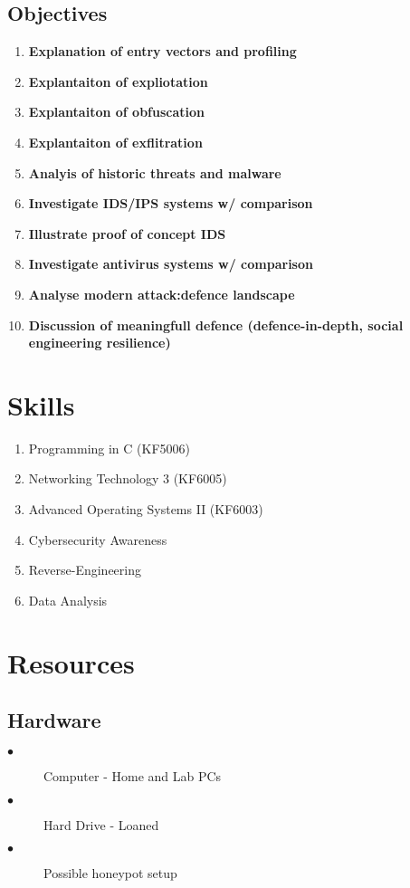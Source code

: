 \subsection{Objectives}
\begin{enumerate}
	\item \textbf{Explanation of entry vectors and profiling}
	\item \textbf{Explantaiton of expliotation}
	\item \textbf{Explantaiton of obfuscation}
	\item \textbf{Explantaiton of exflitration}
	\item \textbf{Analyis of historic threats and malware}
	\item \textbf{Investigate IDS/IPS systems w/ comparison}
	\item \textbf{Illustrate proof of concept IDS}
	\item \textbf{Investigate antivirus systems w/ comparison}
	\item \textbf{Analyse modern attack:defence landscape}
	\item \textbf{Discussion of meaningfull defence (defence-in-depth, social engineering resilience)}
\end{enumerate}


\section{Skills}
\begin{enumerate}
	\item Programming in C (KF5006)
	\item Networking Technology 3 (KF6005)
	\item Advanced Operating Systems II (KF6003)
	\item Cybersecurity Awareness
	\item Reverse-Engineering
	\item Data Analysis
\end{enumerate}

\section{Resources}
\subsection{Hardware}
\begin{description}
	\item[$\bullet$] Computer - Home and Lab PCs
	\item[$\bullet$] Hard Drive - Loaned
	\item[$\bullet$] Possible honeypot setup
\end{description}

